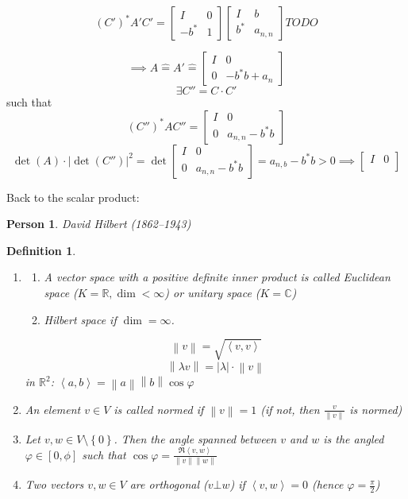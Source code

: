 \documentclass{article}
\newcounter{lecref}[section]
\numberwithin{lecref}{section}
\newtheorem{definition}[lecref]{Definition}
\newtheorem*{person}{Person}
\newcommand{\set}[1]{\left\{#1\right\}}
\newcommand{\ip}[2]{\left\langle#1,#2\right\rangle} %
\newcommand{\norm}[1]{\left\|#1\right\|}
\newcommand{\card}[1]{\left|#1\right|}
\begin{document}
\[
  (C')^* A'C' =\left[
    \begin{array}{c|c}
      I & 0 \\
      \hline
      -b^* & 1
    \end{array}
  \right] \left[
    \begin{array}{c|c}
      I & b \\
      \hline
      b^* & a_{n,n}
    \end{array}
  \right]
  TODO
\]

\[
  \implies A \hat= A' \hat= \begin{bmatrix}
    I & 0 \\ 0 & -b^* b + a_n
  \end{bmatrix}
\] \[
  \exists C'' = C \cdot C'
\]
such that
\[
  (C'')^* AC'' = \left[
    \begin{array}{c|c}
      I & 0 \\
      \hline
      0 & a_{n,n} - b^* b
    \end{array}
  \right]
\] \[
  \det(A) \cdot \card{\det(C'')}^2 = \det\begin{bmatrix}
    I & 0 \\
    0 & a_{n,n} - b^* b
  \end{bmatrix} = a_{n,b} - b^* b > 0
  \implies \begin{bmatrix}
    I & 0 \\

  \end{bmatrix}
\]

Back to the scalar product:

\begin{person}
  David Hilbert (1862--1943)
\end{person}

\begin{definition} %
  \begin{enumerate}
    \item
      \begin{enumerate}
        \item A vector space with a positive definite inner product
          is called \emph{Euclidean space} ($K = \mathbb R, \dim < \infty$)
          or \emph{unitary space} ($K = \mathbb C$)
        \item Hilbert space if $\dim = \infty$.
      \end{enumerate}

      \[ \norm{v} = \sqrt{\ip vv} \]
      \[ \norm{\lambda v} = \card{\lambda} \cdot \norm{v} \]
      in $\mathbb R^2$: $\ip ab = \norm{a} \norm{b} \cos{\varphi}$
    \item An element $v \in V$ is called \emph{normed} if $\norm{v} = 1$
      (if not, then $\frac{v}{\norm{v}}$ is normed)
    \item
      Let $v, w \in V \setminus \set{0}$. Then the angle spanned between $v$ and $w$ is the angled $\varphi \in [0, \phi]$
      such that $\cos{\varphi} = \frac{\Re{\ip vw}}{\norm{v} \norm{w}}$
    \item Two vectors $v, w \in V$ are orthogonal ($v \bot w$)
      if $\ip vw = 0$ (hence $\varphi = \frac\pi2$)
  \end{enumerate}
\end{definition}
\end{document}
